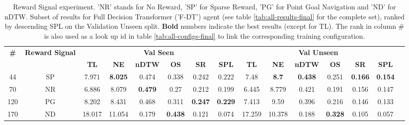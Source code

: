 \begin{table}
\centering
\caption{\label{tab:f_dt_reward_type}Reward Signal experiment. ’NR’ stands for No Reward, ’SP’ for Sparse Reward, ’PG’ for Point Goal Navigation and ’ND’ for nDTW. Subset of results for Full Decision Transformer ('F-DT') agent (see table \ref{tab:all-results-final} for the complete set), ranked by descending SPL on the Validation Unseen split. \textbf{Bold} numbers indicate the best results (except for TL). The rank in column \# is also used as a look up id in table \ref{tab:all-configs-final} to link the corresponding training configuration.}
\begin{tabular}{@{\hskip3pt}c@{\hskip3pt}c@{\hskip3pt}c@{\hskip3pt}c@{\hskip3pt}c@{\hskip3pt}c@{\hskip3pt}c@{\hskip3pt}c@{\hskip3pt}c@{\hskip3pt}c@{\hskip3pt}c@{\hskip3pt}c@{\hskip3pt}c@{\hskip3pt}c@{\hskip3pt}c}
\toprule
                                  \textbf{\#} & \textbf{Reward Signal} & \multicolumn{6}{c}{\textbf{Val Seen}} & \multicolumn{6}{c}{\textbf{Val Unseen}} \\
\cmidrule(l){3-8}\cmidrule(l){9-14}\textbf{~} &             \textbf{~} &       \textbf{TL} &     \textbf{NE} &   \textbf{nDTW} &     \textbf{OS} &     \textbf{SR} &    \textbf{SPL} &         \textbf{TL} &   \textbf{NE} &   \textbf{nDTW} &     \textbf{OS} &     \textbf{SR} &    \textbf{SPL} \\
\midrule
                                           44 &                     SP &             7.971 &  \textbf{8.025} &           0.474 &           0.338 &           0.242 &           0.222 &                7.48 &  \textbf{8.7} &  \textbf{0.438} &           0.251 &  \textbf{0.166} &  \textbf{0.154} \\
                                           70 &                     NR &             6.886 &           8.079 &  \textbf{0.479} &            0.27 &           0.212 &           0.199 &               6.445 &         8.779 &           0.421 &           0.191 &           0.156 &           0.147 \\
                                          120 &                     PG &             8.202 &           8.431 &           0.468 &           0.311 &  \textbf{0.247} &  \textbf{0.229} &               7.413 &          9.59 &           0.396 &           0.216 &           0.146 &           0.133 \\
                                          170 &                     ND &            18.017 &          11.054 &           0.179 &  \textbf{0.438} &           0.121 &           0.074 &              17.259 &        10.378 &           0.188 &  \textbf{0.328} &           0.105 &           0.057 \\
\bottomrule
\end{tabular}
\end{table}
